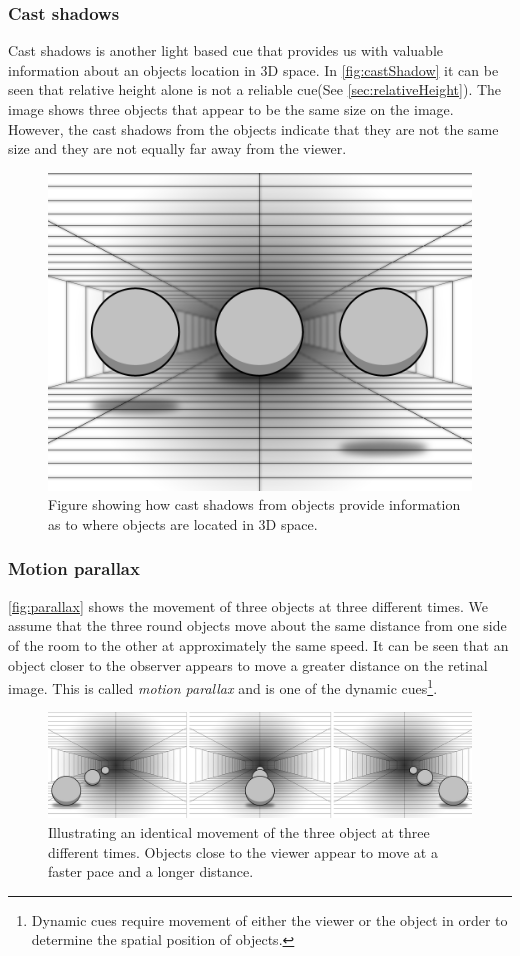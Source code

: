 \subsubsection{Cast shadows}
Cast shadows is another light based cue that provides us with valuable information about an objects location in 3D space. In \autoref{fig:castShadow} it can be seen that relative height alone is not a reliable cue(See \autoref{sec:relativeHeight}). The image shows three objects that appear to be the same size on the image. However, the cast shadows from the objects indicate that they are not the same size and they are not equally far away from the viewer\citep[p.~203]{sensationPerception}.
\begin{figure}[H]
	\centering
	\includegraphics[width=0.75\linewidth]{figure/Frontpage/frontpage2.png}
	\caption{Figure showing how cast shadows from objects provide information as to where objects are located in 3D space.}
	\label{fig:castShadow}
\end{figure}

\subsubsection{Motion parallax}\label{sec:parallax}
\autoref{fig:parallax} shows the movement of three objects at three different times. We assume that the three round objects move about the same distance from one side of the room to the other at approximately the same speed. It can be seen that an object closer to the observer appears to move a greater distance on the retinal image. This is called \textit{motion parallax} and is one of the dynamic cues\footnote{Dynamic cues require movement of either the viewer or the object in order to determine the spatial position of objects\citep{sensationPerception}.}\citep[p.~204]{sensationPerception}.
\begin{figure}[H]
	\centering
	\includegraphics[width=1\linewidth]{figure/Analysis/parallax.png}
	\caption{Illustrating an identical movement of the three object at three different times. Objects close to the viewer appear to move at a faster pace and a longer distance.}
	\label{fig:parallax}
\end{figure}

